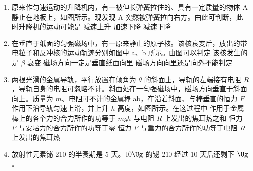 \documentclass[\gkver]{gaokaozhenti}
\begin{document}
\begin{enumerate}
\item
原来作匀速运动的升降机内，有一被伸长弹簧拉住的、具有一定质量的物体 A 静止在地板上，如图所示。现发现 A 突然被弹簧拉向右方。由此可判断，此时升降机的运动可能是
\onepicture[h=3.59cm]{}
{减速上升}
{加速下降}
{减速下降}

\item
在垂直于纸面的匀强磁场中，有一原来静止的原子核。该核衰变后，放出的带电粒子和反冲核的运动轨迹分别如图中 a、b 所示。由图可以判定
\onepicture[w=2.51cm]{}
{该核发生的是 $\beta$ 衰变}
{磁场方向一定是垂直纸面向里}
{磁场方向向里还是向外不能判定}

\item
两根光滑的金属导轨，平行放置在倾角为 $\theta$ 的斜面上，导轨的左端接有电阻 $R$，导轨自身的电阻可忽略不计。斜面处在一匀强磁场中，磁场方向垂直于斜面向上。质量为 $m$、电阻可不计的金属棒 ab，在沿着斜面、与棒垂直的恒力 $F$ 作用下沿导轨匀速上滑，并上升 $h$ 高度，如图所示。在这过程中
\onepicture[w=6.24cm]{}
{作用于金属棒上的各个力的合力所作的功等于 $mgh$ 与电阻 $R$ 上发出的焦耳热之和}
{恒力 $F$ 与安培力的合力所作的功等于零}
{恒力 $F$ 与重力的合力所作的功等于电阻 $R$ 上发出的焦耳热}

\item
放射性元素铋 210 的半衰期是 5 天。$10\Ug$ 的铋 210 经过 10 天后还剩下 $\Ug$。


\end{enumerate}
\end{document}
